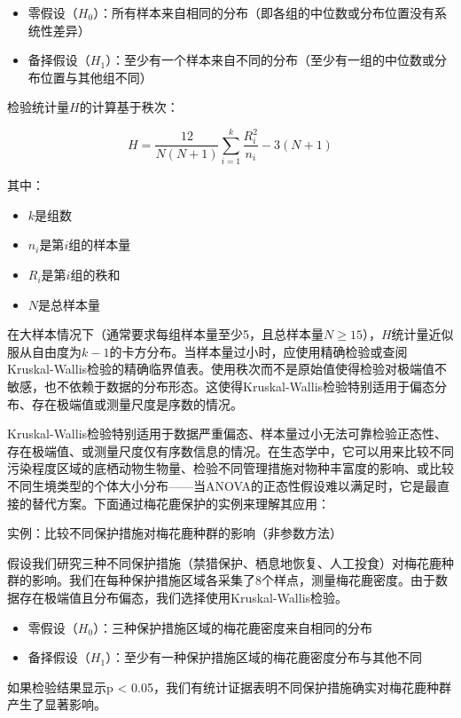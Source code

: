 \documentclass[
  twoside,12pt,fontset=none]{ctexbook}
\providecommand{\tightlist}{%
  \setlength{\itemsep}{0pt}\setlength{\parskip}{0pt}}
\renewenvironment{quote}{%
  \def\FrameCommand{{\color{quote-border}\vrule width 4pt}\hspace{10pt}}%
  \MakeFramed {\advance\hsize-\width \FrameRestore\noindent\ignorespaces}%
}{%
  \endMakeFramed
}
\begin{document}
\begin{itemize}
\tightlist
\item
  零假设（\(H_0\)）：所有样本来自相同的分布（即各组的中位数或分布位置没有系统性差异）
\item
  备择假设（\(H_1\)）：至少有一个样本来自不同的分布（至少有一组的中位数或分布位置与其他组不同）
\end{itemize}

检验统计量\(H\)的计算基于秩次：

\[H = \frac{12}{N(N+1)} \sum_{i=1}^k \frac{R_i^2}{n_i} - 3(N+1)\]

其中：

\begin{itemize}
\tightlist
\item
  \(k\)是组数
\item
  \(n_i\)是第\(i\)组的样本量
\item
  \(R_i\)是第\(i\)组的秩和
\item
  \(N\)是总样本量
\end{itemize}

在大样本情况下（通常要求每组样本量至少5，且总样本量\(N \geq 15\)），\(H\)统计量近似服从自由度为\(k-1\)的卡方分布。当样本量过小时，应使用精确检验或查阅Kruskal-Wallis检验的精确临界值表。使用秩次而不是原始值使得检验对极端值不敏感，也不依赖于数据的分布形态。这使得Kruskal-Wallis检验特别适用于偏态分布、存在极端值或测量尺度是序数的情况。

Kruskal-Wallis检验特别适用于数据严重偏态、样本量过小无法可靠检验正态性、存在极端值、或测量尺度仅有序数信息的情况。在生态学中，它可以用来比较不同污染程度区域的底栖动物生物量、检验不同管理措施对物种丰富度的影响、或比较不同生境类型的个体大小分布------当ANOVA的正态性假设难以满足时，它是最直接的替代方案。下面通过梅花鹿保护的实例来理解其应用：

\begin{quote}
实例：比较不同保护措施对梅花鹿种群的影响（非参数方法）

假设我们研究三种不同保护措施（禁猎保护、栖息地恢复、人工投食）对梅花鹿种群的影响。我们在每种保护措施区域各采集了8个样点，测量梅花鹿密度。由于数据存在极端值且分布偏态，我们选择使用Kruskal-Wallis检验。

\begin{itemize}
\tightlist
\item
  零假设（\(H_0\)）：三种保护措施区域的梅花鹿密度来自相同的分布
\item
  备择假设（\(H_1\)）：至少有一种保护措施区域的梅花鹿密度分布与其他不同
\end{itemize}

如果检验结果显示p \textless{} 0.05，我们有统计证据表明不同保护措施确实对梅花鹿种群产生了显著影响。
\end{quote}
\end{document}
